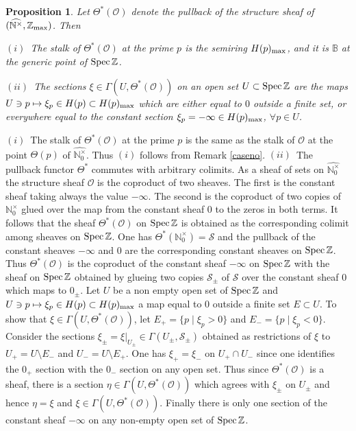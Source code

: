 \documentclass[noams,lp]{compositio}
\newtheorem{prop}[thm]{Proposition}
\def\Spec{{\rm Spec\,}}
\def\B{{\mathbb B}}
\def\N{{\mathbb N}}
\def\Z{{\mathbb Z}}
\def\cO{{\mathcal O}}
\def\cS{{\mathcal S}}
\def\spz{{\Spec\Z}}
\def\zmax{{\Z_{\rm max}}}
\def\arith{{(\wnt,\bar \N)}}
\def\wnt{{\widehat{\N^{\times}}}}
\def\nto{\N_0^{\times}}
\def\wnto{{\widehat{\nto}}}
\def\arith{{(\wnt,\zmax)}}
\begin{document}
\begin{prop}\label{sheavesonspz0} Let $\Theta^*(\cO)$ denote the pullback of the structure sheaf of $\arith$. Then

$(i)$~The stalk of $\Theta^*(\cO)$ at the prime $p$ is the semiring $H(p)_{\rm max}$, and it is 
$\B$ at the generic point of $\Spec\Z$.

$(ii)$~The sections $\xi\in\Gamma(U,\Theta^*(\cO))$ on an open set $U\subset\spz$ are the maps $U\ni p\mapsto \xi_p\in H(p)\subset H(p)_{\rm max}$ which are either equal to $0$ outside a finite set,  or everywhere equal to the constant section   $\xi_p=-\infty \in H(p)_{\rm max}$, $\forall p\in U$.
\end{prop}

\proof $(i)$~The stalk of $\Theta^*(\cO)$ at the prime $p$ is the same as the stalk of $\cO$ at the point $\Theta(p)$ of $\wnto$. Thus $(i)$ follows from Remark \ref{caseno}.\newline
$(ii)$~The pullback functor $ \Theta^*$ commutes with arbitrary colimits. As a sheaf of sets on $\wnto$ the structure sheaf $\cO$ is the coproduct of two sheaves. The first is the constant sheaf taking always the value $-\infty$. The second is the coproduct of two copies of $\nto$ glued over the map from the constant sheaf $0$ to the zeros in both terms. It  follows that the sheaf $ \Theta^*(\cO)$ on $\spz$ is obtained as the corresponding colimit among sheaves on $\spz$. One has  $ \Theta^*(\nto)=\cS$ and the pullback of the constant sheaves  $-\infty$ and $0$ are the corresponding constant sheaves on $\spz$. Thus $ \Theta^*(\cO)$ is the coproduct of the constant sheaf $-\infty$ on $\spz$ with the sheaf on $\spz$ obtained by glueing two copies $\cS_\pm$ of $\cS$ over the constant sheaf $0$ which maps to $0_\pm$. Let $U$ be a non empty open set of $\spz$ and $U\ni p\mapsto \xi_p\in H(p)\subset H(p)_{\rm max}$ a map equal to $0$ outside a finite set $E\subset U$. To show that $\xi\in\Gamma(U,\Theta^*(\cO))$, let $E_+=\{p\mid \xi_p>0\}$ and $E_-=\{p\mid \xi_p<0\}$. Consider the sections $\xi_\pm=\xi\vert_{U_\pm}\in\Gamma(U_\pm,\cS_\pm)$ obtained as restrictions of $\xi$ to $U_+=U\setminus E_-$ and $U_-=U\setminus E_+$. One has $\xi_+=\xi_-$ on $U_+\cap U_-$ since one identifies the $0_+$ section with the $0_-$ section on any open set. Thus since $ \Theta^*(\cO)$ is a sheaf, there is a section $\eta \in\Gamma(U,\Theta^*(\cO))$ which agrees with $\xi_\pm$ on $U_\pm$ and hence $\eta=\xi$ and $\xi\in\Gamma(U,\Theta^*(\cO))$. Finally there is only one section of the constant sheaf $-\infty$ on any non-empty open set of $\spz$. 
\endproof 
\end{document}
